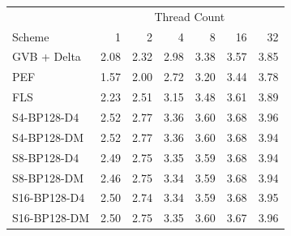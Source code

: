 \begin{tabular}{lrrrrrr}
\toprule
 & \multicolumn{6}{c}{Thread Count} \\
Scheme & 1 & 2 & 4 & 8 & 16 & 32 \\
\midrule
GVB + Delta & 2.08 & 2.32 & 2.98 & 3.38 & 3.57 & 3.85 \\
PEF & 1.57 & 2.00 & 2.72 & 3.20 & 3.44 & 3.78 \\
FLS & 2.23 & 2.51 & 3.15 & 3.48 & 3.61 & 3.89 \\
S4-BP128-D4 & 2.52 & 2.77 & 3.36 & 3.60 & 3.68 & 3.96 \\
S4-BP128-DM & 2.52 & 2.77 & 3.36 & 3.60 & 3.68 & 3.94 \\
S8-BP128-D4 & 2.49 & 2.75 & 3.35 & 3.59 & 3.68 & 3.94 \\
S8-BP128-DM & 2.46 & 2.75 & 3.34 & 3.59 & 3.68 & 3.94 \\
S16-BP128-D4 & 2.50 & 2.74 & 3.34 & 3.59 & 3.68 & 3.95 \\
S16-BP128-DM & 2.50 & 2.75 & 3.35 & 3.60 & 3.67 & 3.96 \\
\bottomrule
\end{tabular}
